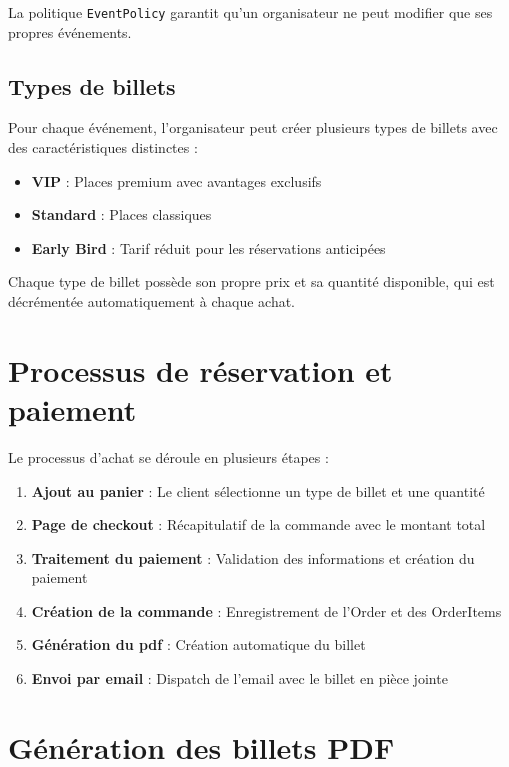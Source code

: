 \documentclass[a4paper,12pt,twoside]{report}
\begin{document}
La politique \texttt{EventPolicy} garantit qu'un organisateur ne peut modifier que ses propres événements.

\subsection{Types de billets}

Pour chaque événement, l'organisateur peut créer plusieurs types de billets avec des caractéristiques distinctes :
\begin{itemize}
    \item \textbf{VIP} : Places premium avec avantages exclusifs
    \item \textbf{Standard} : Places classiques
    \item \textbf{Early Bird} : Tarif réduit pour les réservations anticipées
\end{itemize}

Chaque type de billet possède son propre prix et sa quantité disponible, qui est décrémentée automatiquement à chaque achat.

\section{Processus de réservation et paiement}

Le processus d'achat se déroule en plusieurs étapes :

\begin{enumerate}
    \item \textbf{Ajout au panier} : Le client sélectionne un type de billet et une quantité
    \item \textbf{Page de checkout} : Récapitulatif de la commande avec le montant total
    \item \textbf{Traitement du paiement} : Validation des informations et création du paiement
    \item \textbf{Création de la commande} : Enregistrement de l'Order et des OrderItems
    \item \textbf{Génération du \gls{pdf}} : Création automatique du billet
    \item \textbf{Envoi par email} : Dispatch de l'email avec le billet en pièce jointe
\end{enumerate}

\section{Génération des billets PDF}
\end{document}
